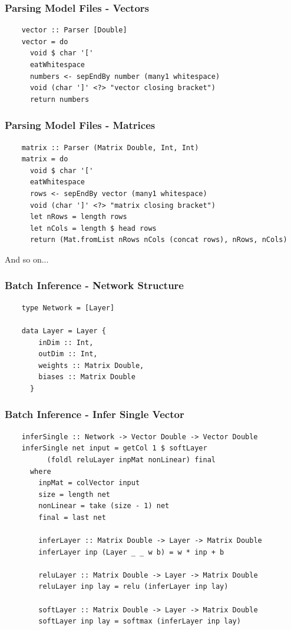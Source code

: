 \documentclass{beamer}
\begin{document}
\begin{frame}[fragile]
  \frametitle{Parsing Model Files - Vectors}

  \begin{lstlisting}
    vector :: Parser [Double]
    vector = do
      void $ char '['
      eatWhitespace
      numbers <- sepEndBy number (many1 whitespace)
      void (char ']' <?> "vector closing bracket")
      return numbers
  \end{lstlisting}
    
\end{frame}

\begin{frame}[fragile]
  \frametitle{Parsing Model Files - Matrices}

  \begin{lstlisting}
    matrix :: Parser (Matrix Double, Int, Int)
    matrix = do
      void $ char '['
      eatWhitespace
      rows <- sepEndBy vector (many1 whitespace)
      void (char ']' <?> "matrix closing bracket")
      let nRows = length rows
      let nCols = length $ head rows
      return (Mat.fromList nRows nCols (concat rows), nRows, nCols)
  \end{lstlisting}
    
  And so on...
\end{frame}

\begin{frame}[fragile]
  \frametitle{Batch Inference - Network Structure}

  \begin{lstlisting}
    type Network = [Layer]
    
    data Layer = Layer {
        inDim :: Int,
        outDim :: Int,
        weights :: Matrix Double,
        biases :: Matrix Double
      }
  \end{lstlisting}
    
\end{frame}

\begin{frame}[fragile]
  \frametitle{Batch Inference - Infer Single Vector}

  \begin{lstlisting}
    inferSingle :: Network -> Vector Double -> Vector Double
    inferSingle net input = getCol 1 $ softLayer 
          (foldl reluLayer inpMat nonLinear) final
      where
        inpMat = colVector input
        size = length net
        nonLinear = take (size - 1) net
        final = last net
    
        inferLayer :: Matrix Double -> Layer -> Matrix Double
        inferLayer inp (Layer _ _ w b) = w * inp + b
    
        reluLayer :: Matrix Double -> Layer -> Matrix Double
        reluLayer inp lay = relu (inferLayer inp lay)
    
        softLayer :: Matrix Double -> Layer -> Matrix Double
        softLayer inp lay = softmax (inferLayer inp lay)
  \end{lstlisting}
        
\end{frame}
\end{document}
